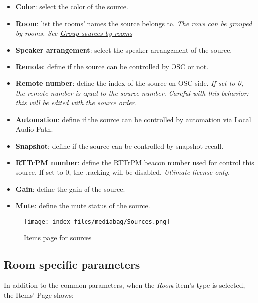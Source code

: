 \documentclass[
  letterpaper,
  DIV=11,
  numbers=noendperiod]{scrreport}
\providecommand{\tightlist}{%
  \setlength{\itemsep}{0pt}\setlength{\parskip}{0pt}}\usepackage{longtable,booktabs,array}
\begin{document}
\begin{itemize}
\tightlist
\item
  \textbf{Color}: select the color of the source.
\item
  \textbf{Room}: list the rooms' names the source belongs to. \emph{The
  rows can be grouped by rooms. See
  \protect\hyperlink{Groupux5cux2520sourcesux5cux2520byux5cux2520rooms}{Group
  sources by rooms}}
\item
  \textbf{Speaker arrangement}: select the speaker arrangement of the
  source.
\item
  \textbf{Remote}: define if the source can be controlled by OSC or not.
\item
  \textbf{Remote number}: define the index of the source on OSC side.
  \emph{If set to 0, the remote number is equal to the source number.
  Careful with this behavior: this will be edited with the source
  order.}
\item
  \textbf{Automation}: define if the source can be controlled by
  automation via Local Audio Path.
\item
  \textbf{Snapshot}: define if the source can be controlled by snapshot
  recall.
\item
  \textbf{RTTrPM number}: define the RTTrPM beacon number used for
  control this source. If set to 0, the tracking will be disabled.
  \emph{Ultimate license only.}
\item
  \textbf{Gain}: define the gain of the source.
\item
  \textbf{Mute}: define the mute status of the source.
\end{itemize}

\begin{figure}

{\centering \texttt{[image: index\_files/mediabag/Sources.png]}

}

\caption{Items page for sources}

\end{figure}

\hypertarget{room-specific-parameters}{%
\subsection{Room specific parameters}\label{room-specific-parameters}}

In addition to the common parameters, when the \emph{Room} item's type
is selected, the Items' Page shows:
\end{document}
